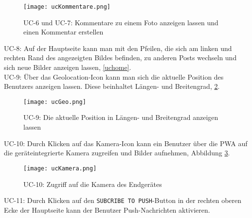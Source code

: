 \begin{figure}[!htb]
    \centering
    \texttt{[image: ucKommentare.png]}
    \caption{UC-6 und UC-7: Kommentare zu einem Foto anzeigen lassen und einen Kommentar erstellen}
    \label{uc6}
\end{figure}

\newpage


UC-8:
Auf der Hauptseite kann man mit den Pfeilen, die sich am linken und rechten Rand des angezeigten Bildes befinden, zu anderen Posts wechseln und sich neue Bilder anzeigen lassen, \ref{uchome}.\\

UC-9:
Über das Geolocation-Icon kann man sich die aktuelle Position des Benutzers anzeigen lassen. Diese beinhaltet Längen- und Breitengrad, \ref{uc9}.\\
\begin{figure}[!htb]
    \centering
    \texttt{[image: ucGeo.png]}
    \caption{UC-9: Die aktuelle Position in Längen- und Breitengrad anzeigen lassen}
    \label{uc9}
\end{figure}

\newpage

UC-10:
Durch Klicken auf das Kamera-Icon kann ein Benutzer über die PWA auf die geräteintegrierte Kamera zugreifen und Bilder aufnehmen, Abbildung \ref{uc10}.\\

\begin{figure}[!htb]
    \centering
    \texttt{[image: ucKamera.png]}
    \caption{UC-10: Zugriff auf die Kamera des Endgerätes}
    \label{uc10}
\end{figure}


UC-11:
Durch Klicken auf den \texttt{SUBCRIBE TO PUSH}-Button in der rechten oberen Ecke der Hauptseite kann der Benutzer Push-Nachrichten aktivieren.


